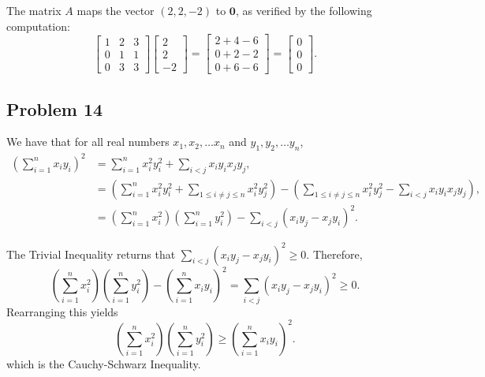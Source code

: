 \documentclass[11pt]{article}
\renewcommand{\vec}[1]{\mathbf{#1}}
\begin{document}
The matrix $A$ maps the vector $(2, 2, -2)$ to $\vec{0}$, as verified by the following computation:
\[
	\begin{bmatrix}	1 & 2 & 3 \\ 0 & 1 & 1 \\ 0 & 3 & 3 \end{bmatrix} \begin{bmatrix} 2 \\ 2 \\ -2 \end{bmatrix} = \begin{bmatrix} 2 + 4 - 6 \\ 0 + 2 - 2 \\ 0 + 6 - 6 \end{bmatrix} = \begin{bmatrix} 0 \\ 0 \\ 0 \end{bmatrix}.
\]

\subsection*{Problem 14}

We have that for all real numbers $x_{1}, x_{2}, \ldots x_{n}$ and $y_{1}, y_{2}, \ldots y_{n}$, 
\begin{align*}
	\left( \sum_{i = 1}^{n} x_{i}y_{i} \right)^{2} &= \sum_{i = 1}^{n} x_{i}^{2} y_{i}^{2} + \sum_{i < j} x_{i} y_{i} x_{j} y_{j}, \\
	&= \left( \sum_{i = 1}^{n} x_{i}^{2} y_{i}^{2} + \sum_{1 \le i \ne j \le n} x_{i}^{2} y_{j}^{2} \right) - \left( \sum_{1 \le i \ne j \le n} x_{i}^{2} y_{j}^{2} - \sum_{i < j} x_{i} y_{i} x_{j} y_{j} \right), \\
	&= \left( \sum_{i = 1}^{n} x_{i}^{2} \right) \left( \sum_{i = 1}^{n} y_{i}^{2} \right) - \sum_{i < j} (x_{i}y_{j} - x_{j}y_{i})^{2}. 
\end{align*}

The Trivial Inequality returns that $\sum_{i < j} (x_{i}y_{j} - x_{j}y_{i})^{2} \ge 0$. Therefore,
\[
	\left( \sum_{i = 1}^{n} x_{i}^{2} \right) \left( \sum_{i = 1}^{n} y_{i}^{2} \right) - \left( \sum_{i = 1}^{n} x_{i}y_{i} \right)^{2} = \sum_{i < j} (x_{i}y_{j} - x_{j}y_{i})^{2} \ge 0.
\]
Rearranging this yields 
\[
	\left( \sum_{i = 1}^{n} x_{i}^{2} \right) \left( \sum_{i = 1}^{n} y_{i}^{2} \right) \ge \left( \sum_{i = 1}^{n} x_{i}y_{i} \right)^{2}.
\]
which is the Cauchy-Schwarz Inequality.

\end{document}

